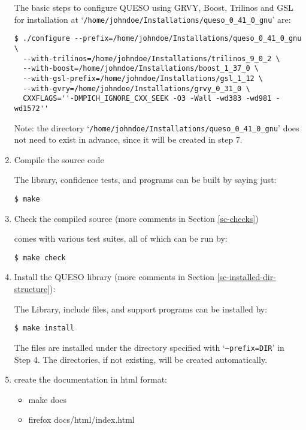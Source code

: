 \begin{enumerate}
{The basic steps to configure QUESO using GRVY, Boost, Trilinos and GSL for installation at `\texttt{/home/johndoe/Installations/queso\_0\_41\_0\_gnu}' are:
\begin{verbatim}
$ ./configure --prefix=/home/johndoe/Installations/queso_0_41_0_gnu \
  --with-trilinos=/home/johndoe/Installations/trilinos_9_0_2 \
  --with-boost=/home/johndoe/Installations/boost_1_37_0 \
  --with-gsl-prefix=/home/johndoe/Installations/gsl_1_12 \
  --with-gvry=/home/johndoe/Installations/grvy_0_31_0 \
  CXXFLAGS=''-DMPICH_IGNORE_CXX_SEEK -O3 -Wall -wd383 -wd981 -wd1572''
\end{verbatim}

Note: the directory `\Verb+/home/johndoe/Installations/queso_0_41_0_gnu+' does not need to exist in advance, since it will be created in step 7.
}

\item {Compile the \Queso{} source code %

The library, confidence tests, and programs can be built by saying just:
\begin{verbatim}
$ make
\end{verbatim}
}

\item {Check the compiled source (more comments in Section \ref{sc-checks})%

\Queso{} comes with various test suites, all of which can be run by:
\begin{verbatim}
$ make check
\end{verbatim}
}

\item {Install the QUESO library (more comments in Section \ref{sc-installed-dir-structure}): %

The \Queso{} Library, include files, and support programs can be installed by: %
\begin{verbatim}
$ make install 
\end{verbatim}}

The files are installed under the directory specified with `\texttt{--prefix=DIR}' in Step 4. The directories, if not existing, will be
        created automatically.%

\item {create the documentation in html format: %
\begin{itemize}
\item make docs
\item firefox docs/html/index.html
\end{itemize}
}
\end{enumerate}

